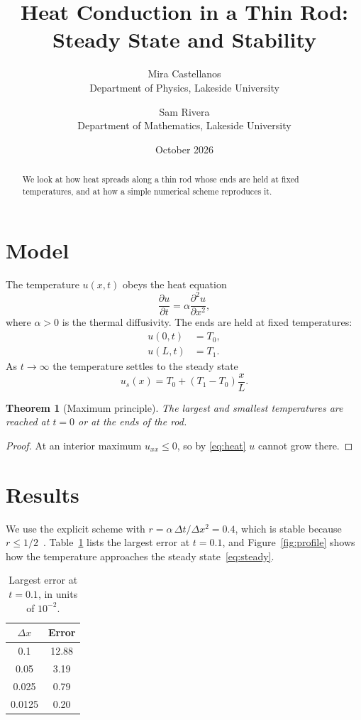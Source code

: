 \documentclass[11pt]{article}
\title{Heat Conduction in a Thin Rod: Steady State and Stability}
\author{Mira Castellanos\\ \small Department of Physics, Lakeside University \and Sam Rivera\\ \small Department of Mathematics, Lakeside University}
\date{October 2026}
\newtheorem{theorem}{Theorem}
\begin{document}
\maketitle

\begin{abstract}
We look at how heat spreads along a thin rod whose ends are held at fixed
temperatures, and at how a simple numerical scheme reproduces it.
\end{abstract}



\section{Model}\label{sec:model}
The temperature $u(x,t)$ obeys the heat equation
\begin{equation}
  \frac{\partial u}{\partial t} = \alpha \frac{\partial^2 u}{\partial x^2}, \label{eq:heat}
\end{equation}
where $\alpha > 0$ is the thermal diffusivity. The ends are held at fixed temperatures:
\begin{align}
  u(0,t) &= T_0, \label{eq:bc0} \\
  u(L,t) &= T_1. \label{eq:bc1}
\end{align}
As $t \to \infty$ the temperature settles to the steady state
\begin{equation}
  u_s(x) = T_0 + (T_1 - T_0)\frac{x}{L}. \label{eq:steady}
\end{equation}

\begin{theorem}[Maximum principle]\label{thm:max}
The largest and smallest temperatures are reached at $t = 0$ or at the ends of the rod.
\end{theorem}
\begin{proof}
At an interior maximum $u_{xx} \le 0$, so by \eqref{eq:heat} $u$ cannot grow there.
\end{proof}

\section{Results}\label{sec:results}
We use the explicit scheme with $r = \alpha\,\Delta t/\Delta x^2 = 0.4$, which is stable
because $r \le 1/2$~\cite{smith1985}. Table~\ref{tab:err} lists the largest error at
$t = 0.1$, and Figure~\ref{fig:profile} shows how the temperature approaches the steady state~\eqref{eq:steady}.

\begin{table}[htbp]
  \centering
  \caption{Largest error at $t = 0.1$, in units of $10^{-2}$.}
  \label{tab:err}
  \begin{tabular}{cc}
    \toprule
    $\Delta x$ & Error \\
    \midrule
    0.1 & 12.88 \\
    0.05 & 3.19 \\
    0.025 & 0.79 \\
    0.0125 & 0.20 \\
    \bottomrule
  \end{tabular}
\end{table}
\end{document}
